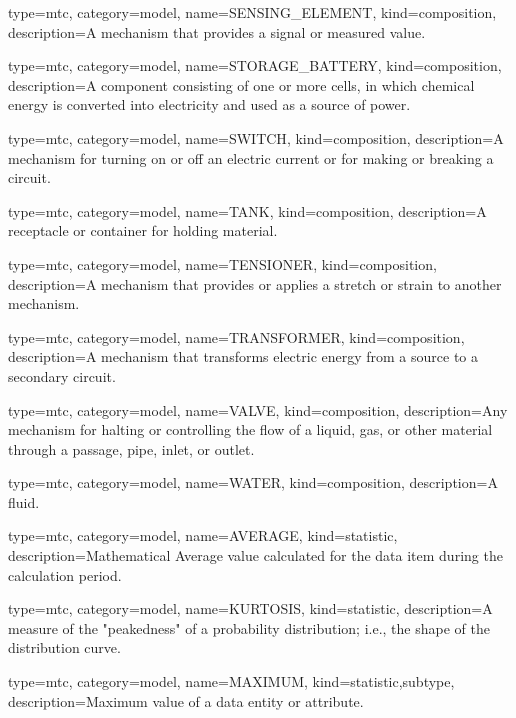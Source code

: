 {
  type=mtc,
  category=model,
  name={SENSING\_ELEMENT},
  kind={composition},
  description={A mechanism that provides a signal or measured value.}
}


{
  type=mtc,
  category=model,
  name={STORAGE\_BATTERY},
  kind={composition},
  description={A component consisting of one or more cells, in which chemical energy is converted into electricity and used as a source of power. }
}


{
  type=mtc,
  category=model,
  name={SWITCH},
  kind={composition},
  description={A mechanism for turning on or off an electric current or for making or breaking a circuit.}
}


{
  type=mtc,
  category=model,
  name={TANK},
  kind={composition},
  description={A receptacle or container for holding material.}
}


{
  type=mtc,
  category=model,
  name={TENSIONER},
  kind={composition},
  description={A mechanism that provides or applies a stretch or strain to another mechanism.}
}


{
  type=mtc,
  category=model,
  name={TRANSFORMER},
  kind={composition},
  description={A mechanism that transforms electric energy from a source to a secondary circuit.}
}


{
  type=mtc,
  category=model,
  name={VALVE},
  kind={composition},
  description={Any mechanism for halting or controlling the flow of a liquid, gas, or other material through a passage, pipe, inlet, or outlet.}
}


{
  type=mtc,
  category=model,
  name={WATER},
  kind={composition},
  description={A fluid.}
}


{
  type=mtc,
  category=model,
  name={AVERAGE},
  kind={statistic},
  description={Mathematical Average value calculated for the data item during the calculation period.}
}


{
  type=mtc,
  category=model,
  name={KURTOSIS},
  kind={statistic},
  description={A measure of the "peakedness" of a probability distribution; i.e., the shape of the distribution curve.}
}


{
  type=mtc,
  category=model,
  name={MAXIMUM},
  kind={statistic,subtype},
  description={Maximum value of a data entity or attribute.}
}


